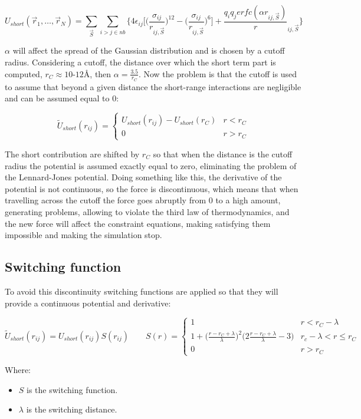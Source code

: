 $$U_{short}(\vec{r}_1, \dots, \vec{r}_N) = \sum\limits_{\vec{S}}\sum\limits_{i>j\in nb}\biggl\{4\epsilon_{ij}\biggl[\biggl(\frac{\sigma_{ij}}{r_{ij, \vec{S}}}\biggr)^{12} - \biggl(\frac{\sigma_{ij}}{r_{ij, \vec{S}}}\biggr)^{6}\biggr] + \frac{q_iq_jerfc(\alpha r_{ij, \vec{S}})}r_{ij, \vec{S}}\biggr\}$$


$\alpha$ will affect the spread of the Gaussian distribution and is chosen by a cutoff radius.
Considering a cutoff, the distance over which the short term part is computed, $r_C\approx 10$-$12\si{\angstrom}$, then $\alpha = \frac{3.5}{r_C}$.
Now the problem is that the cutoff is used to assume that beyond a given distance the short-range interactions are negligible and can be assumed equal to $0$:

$$\tilde{U}_{short}(r_{ij}) = \begin{cases} U_{short}(r_{ij}) - U_{short}(r_C) & r<r_C\\ 0 & r>r_C\end{cases}$$

The short contribution are shifted by $r_C$ so that when the distance is the cutoff radius the potential is assumed exactly equal to zero, eliminating the problem of the Lennard-Jones potential.
Doing something like this, the derivative of the potential is not continuous, so the force is discontinuous, which means that when travelling across the cutoff the force goes abruptly from $0$ to a high amount, generating problems, allowing to violate the third law of thermodynamics, and the new force will affect the constraint equations, making satisfying them impossible and making the simulation stop.

	\subsection{Switching function}
	To avoid this discontinuity switching functions are applied so that they will provide a continuous potential and derivative:

	$$\tilde{U}_{short}(r_{ij}) = U_{short}(r_{ij})S(r_{ij})\qquad S(r) = \begin{cases} 1 & r<r_C-\lambda\\ 1 + \biggl(\frac{r-r_C+\lambda}{\lambda}\biggr)^2\biggl(2\frac{r-r_C + \lambda}{\lambda} - 3\biggr) & r_c -\lambda < r\le r_C\\0 & r> r_C\end{cases}$$

	Where:

	\begin{multicols}{2}
		\begin{itemize}
			\item $S$ is the switching function.
			\item $\lambda$ is the switching distance.
		\end{itemize}
	\end{multicols}


